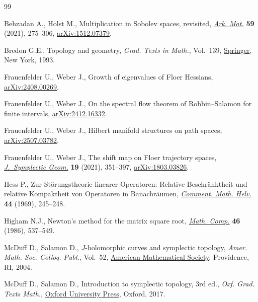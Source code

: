 \documentclass[pdftex]{sigma}
\numberwithin{equation}{section}
\newcommand{\1}{{{\mathchoice {\rm 1\mskip-4mu l} {\rm 1\mskip-4mu l}
{\rm 1\mskip-4.5mu l} {\rm 1\mskip-5mu l}}}}
\begin{document}
\begin{thebibliography}{99}
\footnotesize\itemsep=0pt

Behzadan A., Holst M., Multiplication in {S}obolev spaces, revisited,
 \href{https://doi.org/10.4310/arkiv.2021.v59.n2.a2}{\textit{Ark. Mat.}}
 \textbf{59} (2021), 275--306,
 \href{http://arxiv.org/abs/1512.07379}{arXiv:1512.07379}.

Bredon G.E., Topology and geometry, \textit{Grad. Texts in Math.}, Vol.~139,
 \href{https://doi.org/10.1007/978-1-4757-6848-0}{Springer}, New York, 1993.

Frauenfelder U., Weber J., Growth of eigenvalues of {F}loer {H}essians,
 \href{http://arxiv.org/abs/2408.00269}{arXiv:2408.00269}.

Frauenfelder U., Weber J., On the spectral flow theorem of {R}obbin--{S}alamon
 for finite intervals,
 \href{http://arxiv.org/abs/2412.16332}{arXiv:2412.16332}.

Frauenfelder U., Weber J., Hilbert manifold structures on path spaces,
 \href{http://arxiv.org/abs/2507.03782}{arXiv:2507.03782}.

Frauenfelder U., Weber J., The shift map on {F}loer trajectory spaces,
 \href{https://doi.org/10.4310/JSG.2021.v19.n2.a2}{\textit{J.~Symplectic
 Geom.}} \textbf{19} (2021), 351--397,
 \href{http://arxiv.org/abs/1803.03826}{arXiv:1803.03826}.

Hess P., Zur {S}t\"orungstheorie linearer {O}peratoren: {R}elative
 {B}eschr\"anktheit und relative {K}ompaktheit von {O}peratoren in
 {B}anachr\"aumen, \href{https://doi.org/10.1007/BF02564526}{\textit{Comment.
 Math. Helv.}} \textbf{44} (1969), 245--248.

Higham N.J., Newton's method for the matrix square root,
 \href{https://doi.org/10.2307/2007992}{\textit{Math. Comp.}} \textbf{46}
 (1986), 537--549.

McDuff D., Salamon D., {$J$}-holomorphic curves and symplectic topology,
 \textit{Amer. Math. Soc. Colloq. Publ.}, Vol.~52,
 \href{https://doi.org/10.1090/coll/052}{American Mathematical Society},
 Providence, RI, 2004.

McDuff D., Salamon D., Introduction to symplectic topology, 3rd ed., \textit{Oxf. Grad.
 Texts Math.}, \href{https://doi.org/10.1093/oso/9780198794899.001.0001}{Oxford
 University Press}, Oxford, 2017.


\end{thebibliography}
\end{document}
